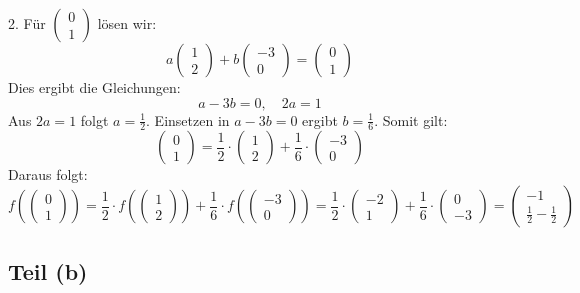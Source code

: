 \documentclass[11pt]{article}
\begin{document}
2. Für \( \begin{pmatrix} 0 \\ 1 \end{pmatrix} \) lösen wir:
\[
a \begin{pmatrix} 1 \\ 2 \end{pmatrix} + b \begin{pmatrix} -3 \\ 0 \end{pmatrix} = \begin{pmatrix} 0 \\ 1 \end{pmatrix}
\]
Dies ergibt die Gleichungen:
\[
a - 3b = 0, \quad 2a = 1
\]
Aus \( 2a = 1 \) folgt \( a = \frac{1}{2} \). Einsetzen in \( a - 3b = 0 \) ergibt \( b = \frac{1}{6} \). Somit gilt:
\[
\begin{pmatrix} 0 \\ 1 \end{pmatrix} = \frac{1}{2} \cdot \begin{pmatrix} 1 \\ 2 \end{pmatrix} + \frac{1}{6} \cdot \begin{pmatrix} -3 \\ 0 \end{pmatrix}
\]
Daraus folgt:
\[
f\left(\begin{pmatrix} 0 \\ 1 \end{pmatrix}\right) = \frac{1}{2} \cdot f\left(\begin{pmatrix} 1 \\ 2 \end{pmatrix}\right) + \frac{1}{6} \cdot f\left(\begin{pmatrix} -3 \\ 0 \end{pmatrix}\right) = \frac{1}{2} \cdot \begin{pmatrix} -2 \\ 1 \end{pmatrix} + \frac{1}{6} \cdot \begin{pmatrix} 0 \\ -3 \end{pmatrix} = \begin{pmatrix} -1 \\ \frac{1}{2} - \frac{1}{2} \end{pmatrix}
\]

\subsection*{Teil (b)}
\end{document}
